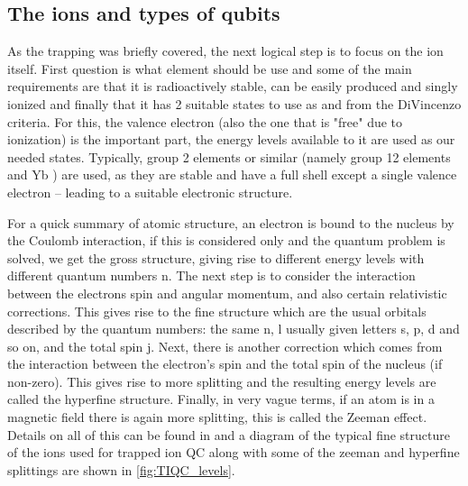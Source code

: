 \subsection{The ions and types of qubits}
As the trapping was briefly covered, the next logical step is to focus on the ion itself.
First question is what element should be use and some of the main requirements are that it is radioactively stable, can be easily produced and singly ionized and finally that it has 2 suitable states to use as \kz and \ko from the DiVincenzo criteria.
For this, the valence electron (also the one that is "free" due to ionization) is the important part, the energy levels available to it are used as our needed states.
Typically, group 2 elements or similar (namely group 12 elements and Yb \cite{ozeriTrappedionQubitTool2011}) are used, as they are stable and have a full shell except a single valence electron -- leading to a suitable electronic structure.

For a quick summary of atomic structure, an electron is bound to the nucleus by the Coulomb interaction, if this is considered only and the quantum problem is solved, we get the gross structure, giving rise to different energy levels with different quantum numbers n.
The next step is to consider the interaction between the electrons spin and angular momentum, and also certain relativistic corrections.
This gives rise to the fine structure which are the usual orbitals described by the quantum numbers: the same n, l usually given letters s, p, d and so on, and the total spin j.
Next, there is another correction which comes from the interaction between the electron's spin and the total spin of the nucleus (if non-zero).
This gives rise to more splitting and the resulting energy levels are called the hyperfine structure.
Finally, in very vague terms, if an atom is in a magnetic field there is again more splitting, this is called the Zeeman effect.
Details on all of this can be found in \cite{woodgateELEMENTARYATOMICSTRUCTURE1970} and a diagram of the typical fine structure of the ions used for trapped ion QC along with some of the zeeman and hyperfine splittings are shown in \cref{fig:TIQC_levels}.


